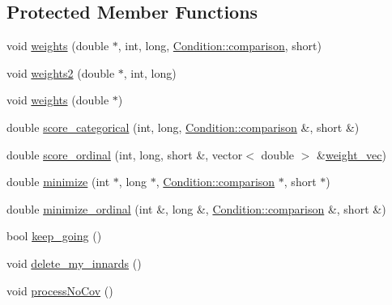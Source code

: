 \subsection*{Protected Member Functions}
\begin{DoxyCompactItemize}
\item 
void \hyperlink{classADTree_a726e3f99718496cce2dbcf88c06e6b35}{weights} (double $\ast$, int, long, \hyperlink{classCondition_af41afbd9545b1fb2e2cb4a4792d52408}{Condition::comparison}, short)
\item 
void \hyperlink{classADTree_a75995e4c656f386c74450e7571b0dfcb}{weights2} (double $\ast$, int, long)
\item 
void \hyperlink{classADTree_a9026beb206f3f2f82c75e948876122da}{weights} (double $\ast$)
\item 
double \hyperlink{classADTree_a6e496b6bfad8f6b5db794728d7eaa426}{score\_\-categorical} (int, long, \hyperlink{classCondition_af41afbd9545b1fb2e2cb4a4792d52408}{Condition::comparison} \&, short \&)
\item 
double \hyperlink{classADTree_ab9b3c82b61aff738c450bd3b03a27631}{score\_\-ordinal} (int, long, short \&, vector$<$ double $>$ \&\hyperlink{classADTree_a3fdcc9137b95113198be7c4861516df0}{weight\_\-vec})
\item 
double \hyperlink{classADTree_a9afd1374b2b77b24cd766be6f4450db7}{minimize} (int $\ast$, long $\ast$, \hyperlink{classCondition_af41afbd9545b1fb2e2cb4a4792d52408}{Condition::comparison} $\ast$, short $\ast$)
\item 
double \hyperlink{classADTree_af44335915afb5cde9d3dcd59ab5de99c}{minimize\_\-ordinal} (int \&, long \&, \hyperlink{classCondition_af41afbd9545b1fb2e2cb4a4792d52408}{Condition::comparison} \&, short \&)
\item 
bool \hyperlink{classADTree_af693c7a7151e15c4c14af80a06fc971c}{keep\_\-going} ()
\item 
void \hyperlink{classADTree_ae6466f8f99be68c8f887b06c3d962964}{delete\_\-my\_\-innards} ()
\item 
void \hyperlink{classADTree_acd444c9e1e4fb4a95ee662f1be89c1cb}{processNoCov} ()
\end{DoxyCompactItemize}
